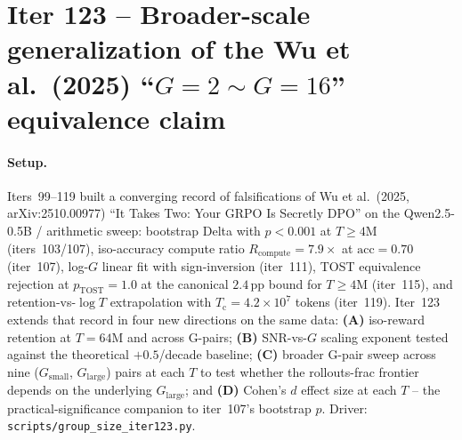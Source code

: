 \section{Iter 123 -- Broader-scale generalization of the Wu et al.\ (2025)
``$G{=}2\sim G{=}16$'' equivalence claim}
\label{sec:group-size-iter123}

\paragraph{Setup.}
Iters~99--119 built a converging record of falsifications of Wu et al.\
(2025, arXiv:2510.00977) ``It Takes Two: Your GRPO Is Secretly DPO''
on the Qwen2.5-0.5B / arithmetic sweep: bootstrap Delta with $p<0.001$
at $T\ge 4$M (iters~103/107), iso-accuracy compute ratio $R_{\mathrm{compute}}=7.9\times$ at $\mathrm{acc}{=}0.70$ (iter~107), log-$G$ linear
fit with sign-inversion (iter~111), TOST equivalence rejection at
$p_{\mathrm{TOST}}{=}1.0$ at the canonical $2.4$\,pp bound for $T\ge 4$M
(iter~115), and retention-vs-$\log T$ extrapolation with
$T_{\mathrm{c}}{=}4.2{\times}10^{7}$ tokens (iter~119). Iter~123
extends that record in four new directions on the same data:
\textbf{(A)} iso-reward retention at $T{=}64$M and across G-pairs;
\textbf{(B)} SNR-vs-$G$ scaling exponent tested against the
theoretical $+0.5$/decade baseline; \textbf{(C)} broader G-pair sweep
across nine ($G_{\mathrm{small}}$, $G_{\mathrm{large}}$) pairs at
each $T$ to test whether the rollouts-frac frontier depends on the
underlying $G_{\mathrm{large}}$; and \textbf{(D)} Cohen's $d$ effect
size at each $T$ -- the practical-significance companion to
iter~107's bootstrap $p$. Driver:
\texttt{scripts/group\_size\_iter123.py}.


